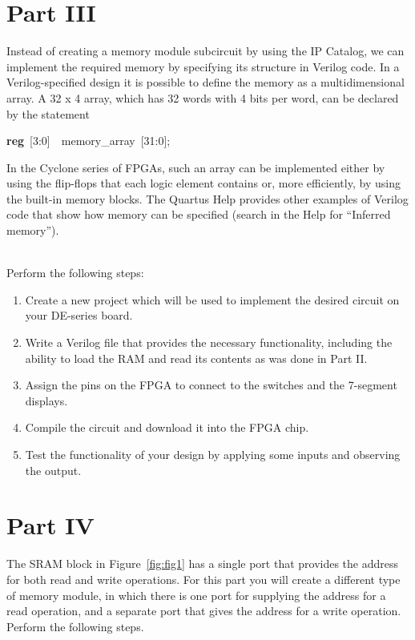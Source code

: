 \documentclass[epsfig,10pt,fullpage]{article}
\begin{document}
\section*{Part III}
Instead of creating a memory module subcircuit by using the IP Catalog, we can implement the 
required memory by specifying its structure in Verilog code.
In a Verilog-specified design it is possible to define the memory as a
multidimensional array. A 32 {\sf x} 4 array, which has 32 words with
4 bits per word, can be declared by the statement

\begin{center}
{\bf reg}~[3:0]~~memory\_array~[31:0];
\end{center}

In the Cyclone series of FPGAs, such an array can be implemented either by using
the flip-flops that each logic element contains or, more efficiently, 
by using the built-in memory blocks.
The Quartus Help provides other examples of Verilog code 
that show how memory can be specified (search in the Help for ``Inferred memory''). 

~\\
Perform the following steps:

\begin{enumerate}
\item Create a new project which will be used to implement the desired
circuit on your DE-series board.
\item Write a Verilog file that provides the necessary functionality,
including the ability to load the RAM and read its contents as was done in
Part II.
\item Assign the pins on the FPGA to connect to the switches and the 
7-segment displays.
\item Compile the circuit and download it into the FPGA chip.
\item Test the functionality of your design by applying some inputs
and observing the output.
\end{enumerate}

\section*{Part IV}
The SRAM block in Figure~\ref{fig:fig1} has a single port that provides the address for 
both read and write operations. For this part you will create a different type of memory module,
in which there is one port for supplying the address for a read operation, and a separate
port that gives the address for a write operation. Perform the following steps.
\end{document}
